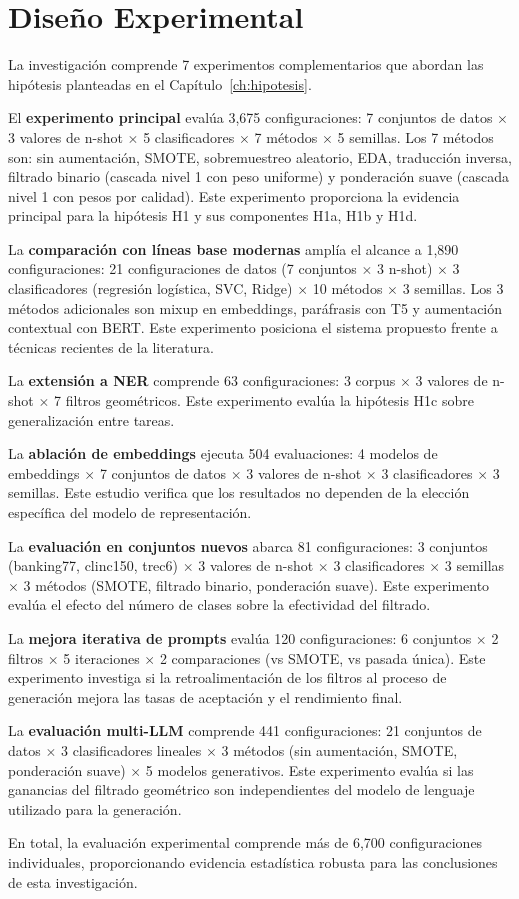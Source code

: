\section{Diseño Experimental}
\label{sec:diseno_experimental}

La investigación comprende 7 experimentos complementarios que abordan las hipótesis planteadas en el Capítulo~\ref{ch:hipotesis}.

El \textbf{experimento principal} evalúa 3,675 configuraciones: 7 conjuntos de datos $\times$ 3 valores de n-shot $\times$ 5 clasificadores $\times$ 7 métodos $\times$ 5 semillas. Los 7 métodos son: sin aumentación, SMOTE, sobremuestreo aleatorio, EDA, traducción inversa, filtrado binario (cascada nivel 1 con peso uniforme) y ponderación suave (cascada nivel 1 con pesos por calidad). Este experimento proporciona la evidencia principal para la hipótesis H1 y sus componentes H1a, H1b y H1d.

La \textbf{comparación con líneas base modernas} amplía el alcance a 1,890 configuraciones: 21 configuraciones de datos (7 conjuntos $\times$ 3 n-shot) $\times$ 3 clasificadores (regresión logística, SVC, Ridge) $\times$ 10 métodos $\times$ 3 semillas. Los 3 métodos adicionales son mixup en embeddings, paráfrasis con T5 y aumentación contextual con BERT. Este experimento posiciona el sistema propuesto frente a técnicas recientes de la literatura.

La \textbf{extensión a NER} comprende 63 configuraciones: 3 corpus $\times$ 3 valores de n-shot $\times$ 7 filtros geométricos. Este experimento evalúa la hipótesis H1c sobre generalización entre tareas.

La \textbf{ablación de embeddings} ejecuta 504 evaluaciones: 4 modelos de embeddings $\times$ 7 conjuntos de datos $\times$ 3 valores de n-shot $\times$ 3 clasificadores $\times$ 3 semillas. Este estudio verifica que los resultados no dependen de la elección específica del modelo de representación.

La \textbf{evaluación en conjuntos nuevos} abarca 81 configuraciones: 3 conjuntos (banking77, clinc150, trec6) $\times$ 3 valores de n-shot $\times$ 3 clasificadores $\times$ 3 semillas $\times$ 3 métodos (SMOTE, filtrado binario, ponderación suave). Este experimento evalúa el efecto del número de clases sobre la efectividad del filtrado.

La \textbf{mejora iterativa de prompts} evalúa 120 configuraciones: 6 conjuntos $\times$ 2 filtros $\times$ 5 iteraciones $\times$ 2 comparaciones (vs SMOTE, vs pasada única). Este experimento investiga si la retroalimentación de los filtros al proceso de generación mejora las tasas de aceptación y el rendimiento final.

La \textbf{evaluación multi-LLM} comprende 441 configuraciones: 21 conjuntos de datos $\times$ 3 clasificadores lineales $\times$ 3 métodos (sin aumentación, SMOTE, ponderación suave) $\times$ 5 modelos generativos. Este experimento evalúa si las ganancias del filtrado geométrico son independientes del modelo de lenguaje utilizado para la generación.

En total, la evaluación experimental comprende más de 6,700 configuraciones individuales, proporcionando evidencia estadística robusta para las conclusiones de esta investigación.

